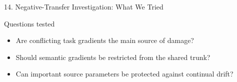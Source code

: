 \documentclass[aspectratio=169,11pt]{beamer}
\begin{document}
\begin{frame}{14. Negative-Transfer Investigation: What We Tried}
\begin{center}
{\begin{tikzpicture}
\end{tikzpicture}%
}

\end{center}

\vspace{-0.2em}

\begin{block}{Questions tested}
\footnotesize
\begin{itemize}
    \setlength{\itemsep}{1pt}
    \setlength{\parskip}{0pt}
    \item Are conflicting task gradients the main source of damage?
    \item Should semantic gradients be restricted from the shared trunk?
    \item Can important source parameters be protected against continual drift?
\end{itemize}
\end{block}

\end{frame}

\end{document}
